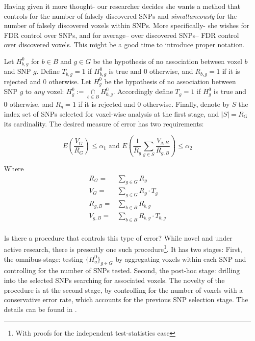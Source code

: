 \documentclass[draft,12pt]{article}
\begin{document}
Having given it more thought- our researcher decides she wants a method that controls for the number of falsely discovered SNPs and \emph{simultaneously} for the number of falsely discovered voxels within SNPs. More specifically- she wishes for FDR control over SNPs, and for average-- over discovered SNPs-- FDR control over discovered voxels. This might be a good time to introduce proper notation.


Let $H^0_{b,g}$ for $b \in B$ and $g \in G$ be the hypothesis of no association between voxel $b$ and SNP $g$. 
Define $T_{b,g}=1$ if $H^0_{b,g}$ is true and 0 otherwise, and $R_{b,g}=1$ if it is rejected and 0 otherwise. Let $H^0_g$ be the hypothesis of no association between SNP $g$ to \emph{any} voxel: $ H^0_g:= \underset{b\in B}{\cap} H^0_{b,g}$.  
Accordingly define $T_{g}=1$ if $H^0_{g}$ is true and 0 otherwise, and $R_{g}=1$ if it is rejected and 0 otherwise. 
Finally, denote by $S$ the index set of SNPs selected for voxel-wise analysis at the first stage, and $\left| S \right|=R_G$ its cardinality. The desired measure of error has two requirements: 


\begin{equation} \label{eq:hirarchial_error}
 E \left(\frac{V_G}{R_G} \right)\leq \alpha_1 
\text{ and } 
E \left( \frac{1}{R_g}\sum_{g \in S} \frac{V_{g,B}}{R_{g,B}} \right)\leq \alpha_2
\end{equation}




Where 
\begin{align*} 
   R_G = {}& \sum_{g \in G} R_g \\
   V_G = {}& \sum_{g \in G} R_g \cdot T_g \\
   R_{g,B} = {}& \sum_{b \in B} R_{b,g}\\
   V_{g,B} = {}& \sum_{b \in B} R_{b,g} \cdot T_{b,g}  \\
\end{align*}

Is there a procedure that controls this type of error? While novel and under active research, there is presently one such procedure\footnote{With proofs for the independent test-statistics case}. It has two stages: 
First, the omnibus-stage:  testing $\{H^0_{g}\}_{g \in G}$ by aggregating voxels within each SNP and controlling for the number of SNPs tested. Second, the post-hoc stage: drilling into the selected SNPs searching for associated voxels. The novelty of the procedure is at the second stage, by controlling for the number of voxels with a conservative error rate, which accounts for the previous SNP selection stage. 
The details can be found in \citet{benjamini_adjusting_2011}.
\end{document}
